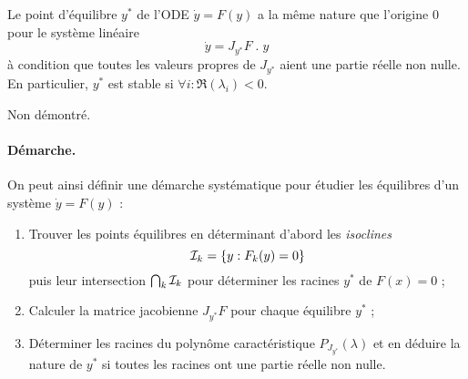 \begin{theorem}
  Le point d'équilibre $y^*$ de l'ODE $\dot y = F(y)$ a la même nature que l'origine $0$ pour le système linéaire 
  $$
  \dot y = J_{y^*}F \; . \; y
  $$
  à condition que toutes les valeurs propres de $J_{y^*}$ aient une partie réelle non nulle. \\
  En particulier, $y^*$ est stable si $\forall i: \Re(\lambda_i) < 0$.
\end{theorem}

\proof Non démontré. \eproof

\paragraph*{Démarche.}
On peut ainsi définir une démarche systématique pour étudier les équilibres d'un système $\dot y = F(y)$ :
\begin{enumerate}
  \item Trouver les points équilibres en déterminant d'abord les {\em isoclines}
  $$
  \mathcal{I}_k = \{y : F_k(y) = 0\}
  $$
  puis leur intersection $\bigcap_k \mathcal{I}_k$ pour déterminer les racines $y^*$ de  $F(x) = 0$ ;
  \item Calculer la matrice jacobienne $J_{y^*} F$ pour chaque équilibre $y^*$ ;
  \item Déterminer les racines du polynôme caractéristique $P_{J_{y^*}}(\lambda)$ et en déduire la nature de $y^*$ si toutes les racines ont une partie réelle non nulle.
\end{enumerate}

